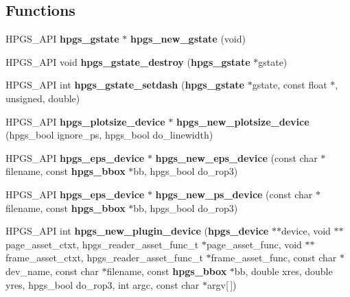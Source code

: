 \subsection*{Functions}
\begin{CompactItemize}
\item 
HPGS\_\-API {\bf hpgs\_\-gstate} $\ast$ {\bf hpgs\_\-new\_\-gstate} (void)
\item 
HPGS\_\-API void {\bf hpgs\_\-gstate\_\-destroy} ({\bf hpgs\_\-gstate} $\ast$gstate)
\item 
HPGS\_\-API int {\bf hpgs\_\-gstate\_\-setdash} ({\bf hpgs\_\-gstate} $\ast$gstate, const float $\ast$, unsigned, double)
\item 
HPGS\_\-API {\bf hpgs\_\-plotsize\_\-device} $\ast$ {\bf hpgs\_\-new\_\-plotsize\_\-device} (hpgs\_\-bool ignore\_\-ps, hpgs\_\-bool do\_\-linewidth)
\item 
HPGS\_\-API {\bf hpgs\_\-eps\_\-device} $\ast$ {\bf hpgs\_\-new\_\-eps\_\-device} (const char $\ast$filename, const {\bf hpgs\_\-bbox} $\ast$bb, hpgs\_\-bool do\_\-rop3)
\item 
HPGS\_\-API {\bf hpgs\_\-eps\_\-device} $\ast$ {\bf hpgs\_\-new\_\-ps\_\-device} (const char $\ast$filename, const {\bf hpgs\_\-bbox} $\ast$bb, hpgs\_\-bool do\_\-rop3)
\item 
HPGS\_\-API int \textbf{hpgs\_\-new\_\-plugin\_\-device} ({\bf hpgs\_\-device} $\ast$$\ast$device, void $\ast$$\ast$page\_\-asset\_\-ctxt, hpgs\_\-reader\_\-asset\_\-func\_\-t $\ast$page\_\-asset\_\-func, void $\ast$$\ast$frame\_\-asset\_\-ctxt, hpgs\_\-reader\_\-asset\_\-func\_\-t $\ast$frame\_\-asset\_\-func, const char $\ast$dev\_\-name, const char $\ast$filename, const {\bf hpgs\_\-bbox} $\ast$bb, double xres, double yres, hpgs\_\-bool do\_\-rop3, int argc, const char $\ast$argv[$\,$])\label{group__device_g32a98f875a08a2a1e5a511ee3f51c5f9}


\end{CompactItemize}
